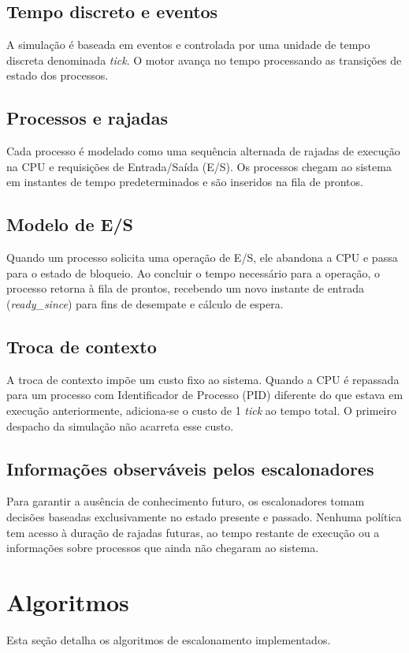 \documentclass[conference]{IEEEtran}
\begin{document}
\subsection{Tempo discreto e eventos}
A simulação é baseada em eventos e controlada por uma unidade de tempo discreta denominada \textit{tick}. O motor avança no tempo processando as transições de estado dos processos.

\subsection{Processos e rajadas}
Cada processo é modelado como uma sequência alternada de rajadas de execução na CPU e requisições de Entrada/Saída (E/S). Os processos chegam ao sistema em instantes de tempo predeterminados e são inseridos na fila de prontos.

\subsection{Modelo de E/S}
Quando um processo solicita uma operação de E/S, ele abandona a CPU e passa para o estado de bloqueio. Ao concluir o tempo necessário para a operação, o processo retorna à fila de prontos, recebendo um novo instante de entrada (\textit{ready\_since}) para fins de desempate e cálculo de espera.

\subsection{Troca de contexto}
A troca de contexto impõe um custo fixo ao sistema. Quando a CPU é repassada para um processo com Identificador de Processo (PID) diferente do que estava em execução anteriormente, adiciona-se o custo de 1 \textit{tick} ao tempo total. O primeiro despacho da simulação não acarreta esse custo.

\subsection{Informações observáveis pelos escalonadores}
Para garantir a ausência de conhecimento futuro, os escalonadores tomam decisões baseadas exclusivamente no estado presente e passado. Nenhuma política tem acesso à duração de rajadas futuras, ao tempo restante de execução ou a informações sobre processos que ainda não chegaram ao sistema.

\section{Algoritmos}
Esta seção detalha os algoritmos de escalonamento implementados.
\end{document}
